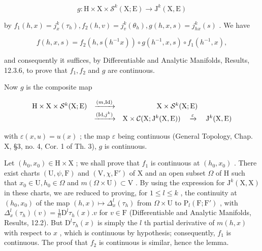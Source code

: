 \[
g: \mathrm{H} \times \mathrm{X} \times \mathcal {S} ^ {k} (\mathrm{X}; \mathrm{E}) \to \mathrm{J} ^ {k} (\mathrm{X}, \mathrm{E})
\]

by \(f_{1}(h,x) = j_{x}^{k}(\tau_{h}),f_{2}(h,v) = j_{v}^{k}(\theta_{h}),g(h,x,s) = j_{hx}^{k}(s)\) . We have

\[
f (h, x, s) = f _ {2} (h, s (h ^ {- 1} x)) \circ g (h ^ {- 1}, x, s) \circ f _ {1} (h ^ {- 1}, x),
\]

and consequently it suffices, by Differentiable and Analytic Manifolds, Results, 12.3.6, to prove that \(f_{1}, f_{2}\) and \(g\) are continuous.

Now \(g\) is the composite map

\[
\begin{array}{c c c} \mathrm{H} \times \mathrm{X} \times \mathcal {S} ^ {k} (\mathrm{X}; \mathrm{E}) & \xrightarrow {(m , \mathrm{Id})} & \mathrm{X} \times \mathcal {S} ^ {k} (\mathrm{X}; \mathrm{E}) \\ & \xrightarrow {(\mathrm{Id} , j ^ {k})} & \mathrm{X} \times \mathcal {C} (\mathrm{X}; \mathrm{J} ^ {k} (\mathrm{X}, \mathrm{E})) \quad \xrightarrow {\varepsilon} \quad \mathrm{J} ^ {k} (\mathrm{X}, \mathrm{E}) \end{array}
\]

with \(\varepsilon(x, u) = u(x)\) ; the map \(\varepsilon\) being continuous (General Topology, Chap. X, §3, no. 4, Cor. 1 of Th. 3), \(g\) is continuous.

Let \((h_{0}, x_{0}) \in \mathrm{H} \times \mathrm{X}\) ; we shall prove that \(f_{1}\) is continuous at \((h_{0}, x_{0})\) . There exist charts \((\mathrm{U}, \psi, \mathrm{F})\) and \((\mathrm{V}, \chi, \mathrm{F}')\) of \(\mathrm{X}\) and an open subset \(\Omega\) of \(\mathrm{H}\) such that \(x_{0} \in \mathrm{U}, h_{0} \in \Omega\) and \(m(\Omega \times \mathrm{U}) \subset \mathrm{V}\) . By using the expression for \(\mathrm{J}^{k}(\mathrm{X}, \mathrm{X})\) in these charts, we are reduced to proving, for \(1 \leq l \leq k\) , the continuity at \((h_{0}, x_{0})\) of the map \((h, x) \mapsto \Delta_{x}^{l}(\tau_{h})\) from \(\Omega \times \mathrm{U}\) to \(\mathrm{P}_{l}(\mathrm{F}; \mathrm{F}')\) , with \(\Delta_{x}^{l}(\tau_{h})(v) = \frac{1}{l!}\mathrm{D}^{l}\tau_{h}(x).v\) for \(v \in \mathrm{F}\) (Differentiable and Analytic Manifolds, Results, 12.2). But \(\mathrm{D}^{l}\tau_{h}(x)\) is simply the \(l\) th partial derivative of \(m(h, x)\) with respect to \(x\) , which is continuous by hypothesis; consequently, \(f_{1}\) is continuous. The proof that \(f_{2}\) is continuous is similar, hence the lemma.

